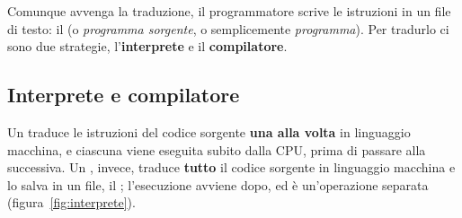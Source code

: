 Comunque avvenga la traduzione, il programmatore scrive le istruzioni in un
file di testo: il  (o \textit{programma sorgente}, o
semplicemente \textit{programma}). Per tradurlo ci sono due strategie,
l'\textbf{interprete} e il \textbf{compilatore}.

\subsection{Interprete e compilatore}

Un  traduce le istruzioni del codice sorgente \textbf{una
alla volta} in linguaggio macchina, e ciascuna viene eseguita subito dalla
CPU, prima di passare alla successiva. Un , invece,
traduce \textbf{tutto} il codice sorgente in linguaggio macchina e lo salva
in un file, il ; l'esecuzione avviene dopo, ed è
un'operazione separata (figura~\ref{fig:interprete}).

